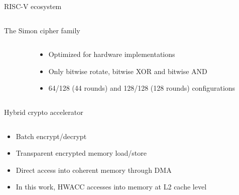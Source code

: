 \documentclass[dvipsnames]{beamer}
\begin{document}
\begin{frame}{RISC-V ecosystem}
\begin{columns}[T]
\begin{column}{0.4\textwidth}
    \end{column}
  \end{columns}
\end{frame}

\begin{frame}{The Simon cipher family}
  \begin{columns}[T]
    \begin{column}{0.35\textwidth}
    
    \end{column}
    \hfill
  \begin{column}{0.65\textwidth}
    \begin{itemize}
    \item Optimized for hardware implementations
    \item Only bitwise rotate, bitwise XOR and bitwise AND
    \item 64/128 (44 rounds) and 128/128 (128 rounds) configurations
    \end{itemize}
  \end{column}
  \end{columns}
\end{frame}

\begin{frame}{Hybrid crypto accelerator}
  \begin{columns}[T]
    \begin{column}{0.5\textwidth}
      \begin{itemize}
      \item Batch encrypt/decrypt
      \item Transparent encrypted memory load/store
      \item Direct access into coherent memory through DMA
      \item In this work, HWACC accesses into memory at L2 cache level
      \end{itemize}
    \end{column}
    \hfill
    \begin{column}{0.5\textwidth}
    \end{column}
  \end{columns}
\end{frame}
\end{document}
